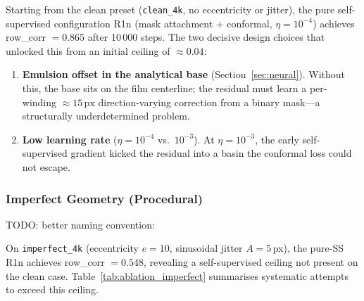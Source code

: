 \documentclass[11pt,a4paper]{article}
\begin{document}
Starting from the clean preset (\texttt{clean\_4k}, no eccentricity or jitter), the pure self-supervised configuration R1n (mask attachment + conformal, $\eta = 10^{-4}$) achieves row\_corr $= 0.865$ after 10\,000 steps. The two decisive design choices that unlocked this from an initial ceiling of $\approx 0.04$:

\begin{enumerate}
    \item \textbf{Emulsion offset in the analytical base} (Section~\ref{sec:neural}). Without this, the base sits on the film centerline; the residual must learn a per-winding $\approx 15\,\text{px}$ direction-varying correction from a binary mask—a structurally underdetermined problem.
    \item \textbf{Low learning rate} ($\eta = 10^{-4}$ vs.\ $10^{-3}$). At $\eta = 10^{-3}$, the early self-supervised gradient kicked the residual into a basin the conformal loss could not escape.
\end{enumerate}

\subsubsection{Imperfect Geometry (Procedural)}

TODO: better naming convention:

On \texttt{imperfect\_4k} (eccentricity $e=10$, sinusoidal jitter $A=5$\,px), the pure-SS R1n achieves row\_corr $= 0.548$, revealing a self-supervised ceiling not present on the clean case. Table~\ref{tab:ablation_imperfect} summarises systematic attempts to exceed this ceiling.
\end{document}
